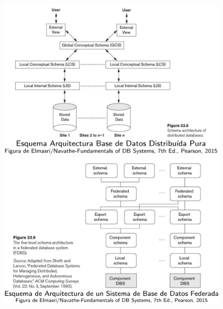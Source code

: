 \begin{figure}[H]
    \centering
    \includegraphics[scale=0.45]{fig/arquitectura-distribuida-pura.png}
    \includegraphics[scale=0.45]{fig/arquitectura-distribuida-federada.png}
\end{figure}

